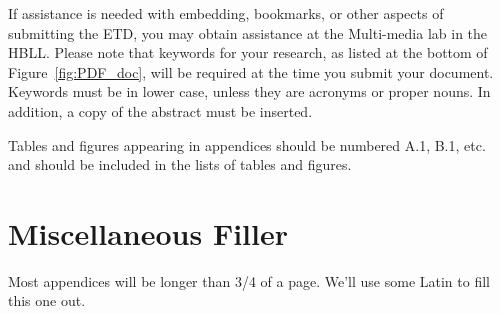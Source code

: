 If assistance is needed with embedding, bookmarks, or other aspects of submitting the ETD, 
you may obtain assistance at the Multi-media lab in the HBLL. Please note that keywords for 
your research, as listed at the bottom of Figure~\ref{fig:PDF_doc}, will be required at the
time you submit your document. Keywords must be in lower case, unless they are acronyms or 
proper nouns. In addition, a copy of the abstract must be inserted.

Tables and figures appearing in appendices should be numbered A.1, B.1, etc. and should be 
included in the lists of tables and figures.

\section{Miscellaneous Filler}
Most appendices will be longer than 3/4 of a page. We'll use some Latin to fill this one out. {\color{mediumgray} \blindtext}



